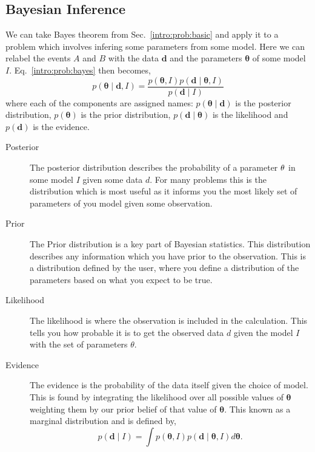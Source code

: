 \subsection{\label{intro:prob:bayes}Bayesian Inference}

We can take Bayes theorem from Sec.~\ref{intro:prob:basic} and apply it to a problem which involves infering some parameters from some model. Here we can relabel the events $A$ and $B$ with the data ${\bm d}$ and the parameters ${\bm \theta}$ of some model $I$.
Eq.~\ref{intro:prob:bayes} then becomes,
\begin{equation}
\label{intro:bayes:bayes}
p({\bm \theta} \mid {\bm d}, I) = \frac{p({\bm \theta}, I)p({\bm d} \mid {\bm \theta}, I)}{p({\bm d} \mid I)}
\end{equation}
where each of the components are assigned names: $p({\bm \theta} \mid {\bm d})$ is the posterior distribution, $p({\bm \theta})$ is the prior distribution,  $p({\bm d} \mid {\bm \theta})$ is the likelihood and $p({\bm d})$ is the evidence.

\begin{description}
	\item [Posterior]
	The posterior distribution describes the probability of a parameter ${\bf \theta}$ in some model $I$ given some data $d$. For many problems this is the distribution which is most useful as it informs you the most likely set of parameters of you model given some observation.
	\item [Prior]
	The Prior distribution is a key part of Bayesian statistics. This distribution describes any information which you have prior to the observation. This is a distribution defined by the user, where you define a distribution of the parameters based on what you expect to be true.
	\item [Likelihood]
	The likelihood is where the observation is included in the calculation. This tells you how probable it is to get the observed data $d$ given the model $I$ with the set of parameters $\theta$. 
	\item [Evidence]
	The evidence is the probability of the data itself given the choice of model. This is found by integrating the likelihood over all possible values of ${\bm \theta}$ weighting them by our prior belief of that value of ${\bm \theta}$. This known as a marginal distribution and is defined by,
	\begin{equation}
	\label{intro:bayes:evidence}
	p({\bm d} \mid I) = \int p({\bm \theta}, I)p({\bm d} \mid {\bm \theta}, I) d{\bm \theta}.
	\end{equation}
\end{description}


